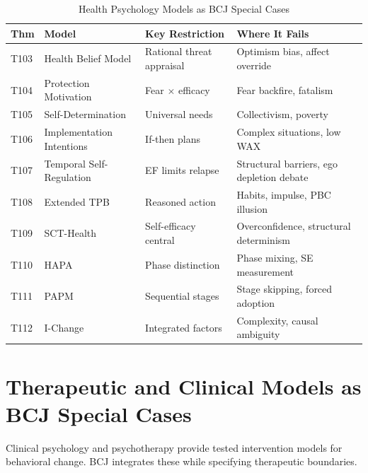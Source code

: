 \begin{table}[htbp]
\centering
\caption{Health Psychology Models as BCJ Special Cases}
\label{tab:health-psych-boundaries}
\renewcommand{\arraystretch}{1.2}
\begin{tabular}{@{}llp{3.5cm}p{4cm}@{}}
\toprule
\textbf{Thm} & \textbf{Model} & \textbf{Key Restriction} & \textbf{Where It Fails} \\
\midrule
T103 & Health Belief Model & Rational threat appraisal & Optimism bias, affect override \\
T104 & Protection Motivation & Fear $\times$ efficacy & Fear backfire, fatalism \\
T105 & Self-Determination & Universal needs & Collectivism, poverty \\
T106 & Implementation Intentions & If-then plans & Complex situations, low WAX \\
T107 & Temporal Self-Regulation & EF limits relapse & Structural barriers, ego depletion debate \\
T108 & Extended TPB & Reasoned action & Habits, impulse, PBC illusion \\
T109 & SCT-Health & Self-efficacy central & Overconfidence, structural determinism \\
T110 & HAPA & Phase distinction & Phase mixing, SE measurement \\
T111 & PAPM & Sequential stages & Stage skipping, forced adoption \\
T112 & I-Change & Integrated factors & Complexity, causal ambiguity \\
\bottomrule
\end{tabular}
\end{table}



\section{Therapeutic and Clinical Models as BCJ Special Cases}
\label{sec:therapeutic-clinical}

Clinical psychology and psychotherapy provide tested intervention models for behavioral change. BCJ integrates these while specifying therapeutic boundaries.


